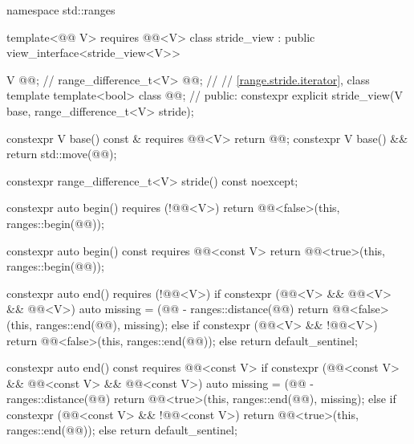 %
\begin{codeblock}
namespace std::ranges {
  template<@@ V>
    requires @@<V>
  class stride_view : public view_interface<stride_view<V>> {
    V @@;                                    // \expos
    range_difference_t<V> @@;              // \expos
    // \ref{range.stride.iterator}, class template 
    template<bool> class @@;              // \expos
  public:
    constexpr explicit stride_view(V base, range_difference_t<V> stride);

    constexpr V base() const & requires @@<V> { return @@; }
    constexpr V base() && { return std::move(@@); }

    constexpr range_difference_t<V> stride() const noexcept;

    constexpr auto begin() requires (!@@<V>) {
      return @@<false>(this, ranges::begin(@@));
    }

    constexpr auto begin() const requires @@<const V> {
      return @@<true>(this, ranges::begin(@@));
    }

    constexpr auto end() requires (!@@<V>) {
      if constexpr (@@<V> && @@<V> && @@<V>) {
        auto missing = (@@ - ranges::distance(@@) %
        return @@<false>(this, ranges::end(@@), missing);
      } else if constexpr (@@<V> && !@@<V>) {
        return @@<false>(this, ranges::end(@@));
      } else {
        return default_sentinel;
      }
    }

    constexpr auto end() const requires @@<const V> {
      if constexpr (@@<const V> && @@<const V> && @@<const V>) {
        auto missing = (@@ - ranges::distance(@@) %
        return @@<true>(this, ranges::end(@@), missing);
      } else if constexpr (@@<const V> && !@@<const V>) {
        return @@<true>(this, ranges::end(@@));
      } else {
        return default_sentinel;
      }
    }

}}
\end{codeblock}
